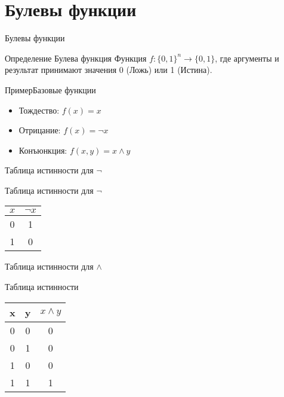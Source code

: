 \documentclass{beamer}
\newenvironment{rusdefinition}[1][Определение]{
    \begin{block}{#1}
}{\end{block}}
\newenvironment{rexample}[1][Пример]{\begin{exampleblock}{#1}}{\end{exampleblock}}
\begin{document}
\section{Булевы функции}
\begin{frame}{Булевы функции}
\begin{rusdefinition}{Булева функция}
Функция $f: \{0,1\}^n \to \{0,1\}$, где аргументы и результат принимают значения 0 (Ложь) или 1 (Истина).
\end{rusdefinition}

\begin{rexample}{Базовые функции}
\begin{itemize}
\item Тождество: $f(x) = x$
\item Отрицание: $f(x) = \neg x$
\item Конъюнкция: $f(x,y) = x \land y$
\end{itemize}
\end{rexample}
\end{frame}
\begin{frame}{Таблица истинности для $\neg$}
    \begin{block}{Таблица истинности для $\neg$}
        \begin{centering}
        \begin{tabular}{c|c}
            $x$ & $\neg x$ \\ \hline
            0 & 1 \\
            1 & 0 \\
            \end{tabular}
        \end{centering}
    \end{block}
    \end{frame}
\begin{frame}{Таблица истинности для $\land$}
\begin{block}{Таблица истинности}
    \begin{centering}
\begin{tabular}{cc|c}
x & y & $x \land y$ \\ \hline
0 & 0 & 0 \\
0 & 1 & 0 \\
1 & 0 & 0 \\
1 & 1 & 1 \\
\end{tabular}
\end{centering}
\end{block}
\end{frame}
\end{document}
